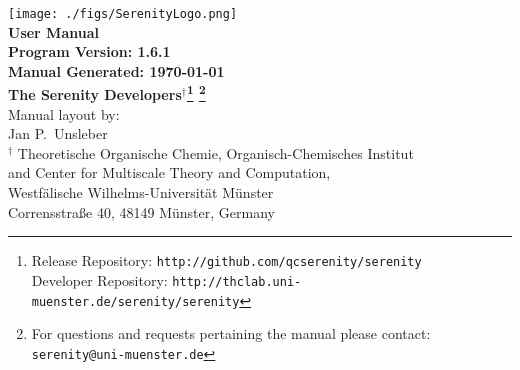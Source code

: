 \documentclass[bibliography=totocnumbered,a4paper,10pt,oneside]{scrbook}
\begin{document}
\thispagestyle{empty}
\begin{center}
\vspace*{1cm}
\texttt{[image: ./figs/SerenityLogo.png]}\\
\vspace{2cm}
{\LARGE\textbf{
User Manual
}}\\
\vspace{1cm}
{\large\textbf{
Program Version: 1.6.1\\
Manual Generated: \today
}}\\
\vspace{2cm}
{\large\textbf{
The Serenity Developers$^{\dagger}$\footnote{Release Repository: \texttt{http://github.com/qcserenity/serenity}\\
                                             Developer Repository: \texttt{http://thclab.uni-muenster.de/serenity/serenity}}
\footnote{For questions and requests pertaining the manual please contact:\\ \texttt{serenity@uni-muenster.de}}
}}\\
\vspace{2cm}
{\large Manual layout by: \\
Jan P.\ Unsleber
}
\\[2ex]

$^{\dagger}$ Theoretische Organische Chemie,
Organisch-Chemisches Institut \\
and Center for Multiscale Theory and Computation,\\
Westf\"alische Wilhelms-Universit\"at M\"unster\\
Corrensstra{\ss}e 40, 48149 M\"unster, Germany\\[2ex]

\vfill
\end{center}
\newpage
{}
\setcounter{page}{1}
\tableofcontents

\newpage
{}
\setcounter{page}{1}
\end{document}
